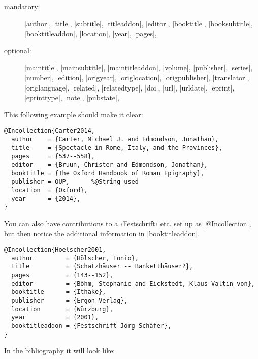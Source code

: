 \documentclass[a4paper,
10pt,
greek,
french,
spanish,
italian,
ngerman,
english
]{ltxdoc}
\begin{document}
\begin{description}
\item[mandatory:] 
|author|, |title|, |subtitle|, |titleaddon|,
|editor|,  |booktitle|, |booksubtitle|, |booktitleaddon|,
|location|, |year|, |pages|, 
\item[optional:]
|maintitle|, |mainsubtitle|, |maintitleaddon|, |volume|, 
|publisher|, |series|, |number|, |edition|, 
|origyear|, |origlocation|, |origpublisher|, 
|translator|, |origlanguage|,
|related|, |relatedtype|,
|doi|, |url|, |urldate|, |eprint|, |eprinttype|, |note|, |pubstate|, 
 \end{description}
 
 
 
This following example should make it clear:
 \begin{lstlisting}[style=bibentry,label=Carter2014,caption={{@}Incollection\{Carter2014,…\} }]
@Incollection{Carter2014,
  author    = {Carter, Michael J. and Edmondson, Jonathan},
  title     = {Spectacle in Rome, Italy, and the Provinces},
  pages     = {537--558},
  editor    = {Bruun, Christer and Edmondson, Jonathan},
  booktitle = {The Oxford Handbook of Roman Epigraphy},
  publisher = OUP,		%@String used
  location  = {Oxford},
  year      = {2014},
}
\end{lstlisting}


You can also have contributions to a ›Festschrift‹ etc. set up as |@Incollection|,
but then notice the additional information in |booktitleaddon|.
\begin{lstlisting}[style=bibentry,label=Hoelscher2001,caption={{@}Incollection\{Hoelscher2001,…\} }]
@Incollection{Hoelscher2001,
  author         = {Hölscher, Tonio},
  title          = {Schatzhäuser -- Banketthäuser?},
  pages          = {143--152},
  editor         = {Böhm, Stephanie and Eickstedt, Klaus-Valtin von},
  booktitle      = {Ithake},
  publisher      = {Ergon-Verlag},
  location       = {Würzburg},
  year           = {2001},
  booktitleaddon = {Festschrift Jörg Schäfer},
}
\end{lstlisting}
In the bibliography it will look like:
\end{document}
